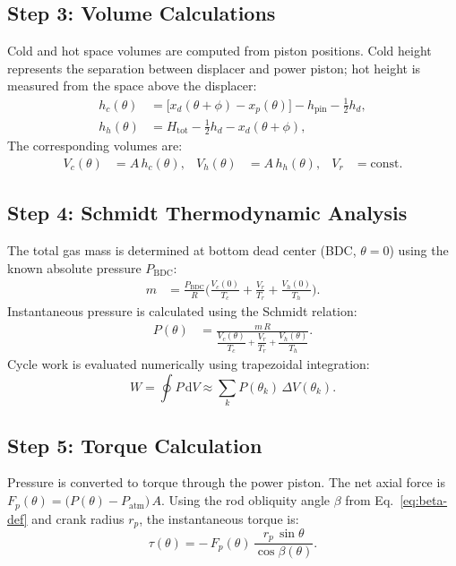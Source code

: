 \documentclass[12pt]{article}
\begin{document}
\subsection{Step 3: Volume Calculations}
Cold and hot space volumes are computed from piston positions. Cold height represents the separation between displacer and power piston; hot height is measured from the space above the displacer:
\begin{align}
  h_{c}(\theta) &= \bigl[x_{d}(\theta+\phi) - x_{p}(\theta)\bigr] - h_{\mathrm{pin}} - \tfrac{1}{2}h_{d},\\
  h_{h}(\theta) &= H_{\mathrm{tot}} - \tfrac{1}{2}h_{d} - x_{d}(\theta+\phi),
\end{align}
The corresponding volumes are:
\begin{align}
  V_{c}(\theta) &= A\,h_{c}(\theta), & V_{h}(\theta) &= A\,h_{h}(\theta), & V_{r} &= \text{const}.
\end{align}

\subsection{Step 4: Schmidt Thermodynamic Analysis}
The total gas mass is determined at bottom dead center (BDC, \(\theta=0\)) using the known absolute pressure \(P_{\mathrm{BDC}}\):
\begin{align}
  m &= \frac{P_{\mathrm{BDC}}}{R}\biggl( \frac{V_{c}(0)}{T_{c}} + \frac{V_{r}}{T_{r}} + \frac{V_{h}(0)}{T_{h}} \biggr).
\end{align}
Instantaneous pressure is calculated using the Schmidt relation:
\begin{align}
  P(\theta) &= \frac{m\,R}{\dfrac{V_{c}(\theta)}{T_{c}} + \dfrac{V_{r}}{T_{r}} + \dfrac{V_{h}(\theta)}{T_{h}} }.
\end{align}
Cycle work is evaluated numerically using trapezoidal integration:
\begin{equation}
  W = \oint P\,\mathrm{d}V \approx \sum_{k} P(\theta_{k})\,\Delta V(\theta_{k}).
\end{equation}

\subsection{Step 5: Torque Calculation}
Pressure is converted to torque through the power piston. The net axial force is \(F_{p}(\theta) = \bigl(P(\theta)-P_{\mathrm{atm}}\bigr)\,A\). Using the rod obliquity angle \(\beta\) from Eq.~\eqref{eq:beta-def} and crank radius \(r_{p}\), the instantaneous torque is:
\begin{equation}
  \tau(\theta) = -\,F_{p}(\theta)\,\frac{r_{p}\,\sin\theta}{\cos\beta(\theta)}.
\end{equation}
\end{document}
